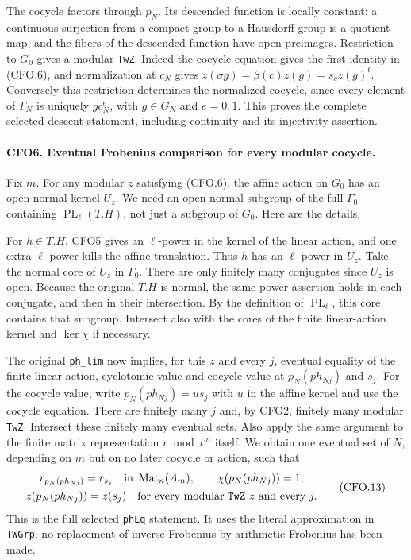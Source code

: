 The cocycle factors through $p_N$.  Its descended function is
locally constant: a continuous surjection from a compact group
to a Hausdorff group is a quotient map, and the fibers of the
descended function have open preimages.  Restriction to $G_0$
gives a modular \texttt{TwZ}.  Indeed the cocycle equation gives
the first identity in (CFO.6), and normalization at $c_N$ gives
$z(\sigma g)=\beta(c)z(g)=s_cz(g)^t$.  Conversely this restriction
determines the normalized cocycle, since every element of
$\Gamma_N$ is uniquely $g c_N^e$, with $g\in G_N$ and $e=0,1$.
This proves the complete selected descent statement, including
continuity and its injectivity assertion.

\paragraph{CFO6. Eventual Frobenius comparison for every modular cocycle.}
\label{claim:CFO6}
Fix $m$.  For any modular $z$ satisfying (CFO.6), the affine
action on $G_0$ has an open normal kernel $U_z$.  We need an
open normal subgroup of the full $\Gamma_0$ containing
$\operatorname{PL}_\ell(T.H)$, not just a subgroup of $G_0$.
Here are the details.

For $h\in T.H$, CFO5 gives an $\ell$-power in the kernel of
the linear action, and one extra $\ell$-power kills the affine
translation.  Thus $h$ has an $\ell$-power in $U_z$.  Take the
normal core of $U_z$ in $\Gamma_0$.  There are only finitely
many conjugates since $U_z$ is open.  Because the original
$T.H$ is normal, the same power assertion holds in each
conjugate, and then in their intersection.  By the definition
of $\operatorname{PL}_\ell$, this core contains that subgroup.
Intersect also with the cores of the finite linear-action
kernel and $\ker\chi$ if necessary.

The original \texttt{ph\_lim} now implies, for this $z$ and
every $j$, eventual equality of the finite linear action,
cyclotomic value and cocycle value at $p_N(ph_{Nj})$ and $s_j$.
For the cocycle value, write $p_N(ph_{Nj})=u s_j$ with $u$
in the affine kernel and use the cocycle equation.  There are
finitely many $j$ and, by CFO2, finitely many modular
\texttt{TwZ}.  Intersect these finitely many eventual sets.
Also apply the same argument to the finite matrix
representation $r\bmod t^m$ itself.  We obtain one eventual
set of $N$, depending on $m$ but on no later cocycle or action,
such that
\[
 \begin{gathered}
 r_{p_N(ph_{Nj})}=r_{s_j}\quad\text{in }\operatorname{Mat}_n(A_m),
 \qquad \chi(p_N(ph_{Nj}))=1,\\
 z(p_N(ph_{Nj}))=z(s_j)
 \quad\text{for every modular \texttt{TwZ} }z\text{ and every }j .
 \end{gathered}                                                   \tag{CFO.13}
\]
This is the full selected \texttt{phEq} statement.  It uses
the literal approximation in \texttt{TWGrp}; no replacement of
inverse Frobenius by arithmetic Frobenius has been made.

